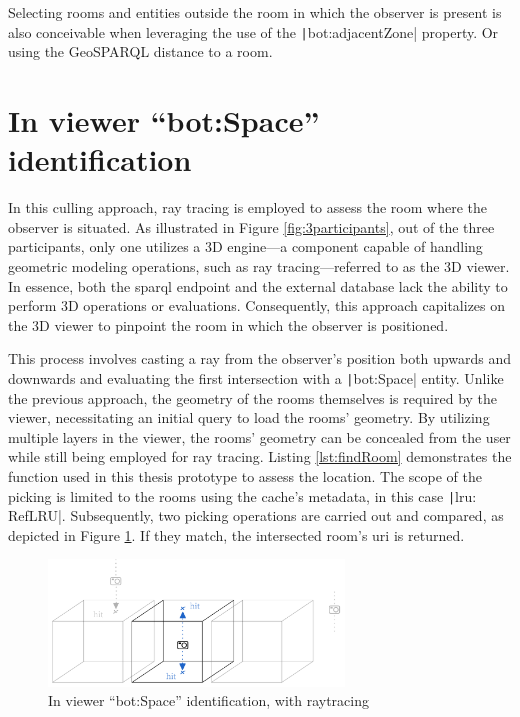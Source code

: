 Selecting rooms and entities outside the room in which the observer is present is also conceivable when leveraging the use of the \texttt|bot:adjacentZone| property. Or using the GeoSPARQL distance to a room.

\section{In viewer \enquote{bot:Space} identification} \label{sec:inViewer}
In this culling approach, ray tracing is employed to assess the room where the observer is situated. As illustrated in Figure \ref{fig:3participants}, out of the three participants, only one utilizes a 3D engine—a component capable of handling geometric modeling operations, such as ray tracing—referred to as the 3D viewer. In essence, both the \ac{sparql} endpoint and the external database lack the ability to perform 3D operations or evaluations. Consequently, this approach capitalizes on the 3D viewer to pinpoint the room in which the observer is positioned.

This process involves casting a ray from the observer's position both upwards and downwards and evaluating the first intersection with a \texttt|bot:Space| entity. Unlike the previous approach, the geometry of the rooms themselves is required by the viewer, necessitating an initial query to load the rooms' geometry. By utilizing multiple layers in the viewer, the rooms' geometry can be concealed from the user while still being employed for ray tracing. Listing \ref{lst:findRoom} demonstrates the function used in this thesis prototype to assess the location. The scope of the picking is limited to the rooms using the cache's metadata, in this case \texttt|lru: RefLRU|. Subsequently, two picking operations are carried out and compared, as depicted in Figure \ref{fig:raytrace}. If they match, the intersected room's \ac{uri} is returned.

\begin{figure}[H]
    \centering
    \includegraphics[width=0.7\textwidth]{figures/pdf/inViewer.pdf}
    \caption{In viewer \enquote{bot:Space} identification, with raytracing}
    \label{fig:raytrace}
\end{figure}

